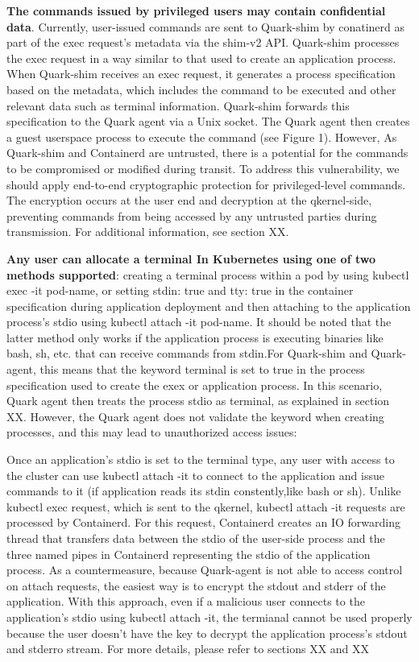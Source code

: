 \textbf{The commands issued by privileged users may contain confidential data}. Currently, user-issued commands are sent to Quark-shim by conatinerd  as part of the exec request’s metadata via the shim-v2 API\cite*{shim_v2}. Quark-shim processes the exec request in 
a way similar to that used to create an application process. When Quark-shim receives an exec request, it generates a process specification based on the metadata, which includes the command to be executed and other relevant data such as 
terminal information. Quark-shim forwards this specification to the Quark agent via a Unix socket. The Quark agent then creates a guest userspace process to execute the command (see Figure 1). However, As Quark-shim and Containerd are 
untrusted, there is a potential for the commands to be compromised or modified during transit. To address this vulnerability, we should apply end-to-end cryptographic protection for privileged-level commands. The encryption occurs at the user end 
and decryption at the qkernel-side, preventing commands from being accessed by any untrusted parties during transmission. For additional information, see section XX.


\textbf{Any user can allocate a terminal In Kubernetes using one of two methods supported}: creating a terminal process within a pod by using kubectl exec -it pod-name, or setting stdin: true and tty: true in the container specification during 
application deployment and then attaching to the application process’s stdio using kubectl attach -it pod-name. It should be noted that the latter method only works if the application process is executing binaries like bash, sh, etc. that can 
receive commands from stdin.For Quark-shim and Quark-agent, this means that the keyword terminal is set to true in the process specification used to create the exex or application process. In this scenario, Quark agent then treats the process 
stdio as terminal, as explained in section XX. However, the Quark agent does not validate the keyword when creating processes, and this may lead to unauthorized access issues:

Once an application's stdio is set to the terminal type, any user with access to the cluster can use kubectl attach -it to connect to the application and issue commands to it (if application reads its stdin constently,like bash or sh). Unlike 
kubectl exec request, which is sent to the qkernel, kubectl attach -it requests are processed by Containerd. For this request, Containerd creates an IO forwarding thread that transfers data between the stdio of the user-side process and the 
three named pipes in Containerd representing the stdio of the application process. As a countermeasure, because Quark-agent is not able to access control on attach requests, the easiest way is to encrypt the stdout and stderr of the application. 
With this approach, even if a malicious user connects to the application's stdio using kubectl attach -it, the termianal cannot be used properly 
because the user doesn’t have the key to decrypt the application process's stdout and stderro stream. For more details, please refer to sections XX and XX


